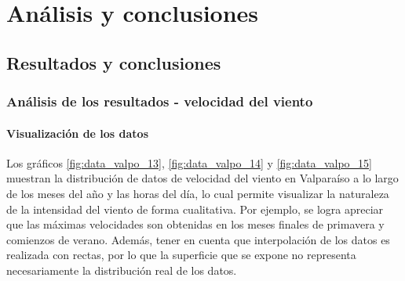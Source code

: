 
\chapter{Análisis y conclusiones}

\section{Resultados y conclusiones}
\subsection{Análisis de los resultados - velocidad del viento}
\subsubsection{Visualización de los datos}
Los gráficos \ref{fig:data_valpo_13}, \ref{fig:data_valpo_14} y \ref{fig:data_valpo_15} muestran la distribución de datos de velocidad del viento en Valparaíso a lo largo de los meses del año y las horas del día, lo cual permite visualizar la naturaleza de la intensidad del viento de forma cualitativa.
Por ejemplo, se logra apreciar que las máximas velocidades son obtenidas en los meses finales de primavera y comienzos de verano. Además, tener en cuenta que interpolación de los datos es realizada con rectas, por lo que la superficie que se expone no representa necesariamente la distribución real de los datos.\\
